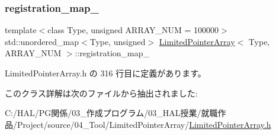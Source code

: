 \subsubsection{\texorpdfstring{registration\+\_\+map\+\_\+}{registration\_map\_}}
{\footnotesize\ttfamily template$<$class Type, unsigned A\+R\+R\+A\+Y\+\_\+\+N\+UM = 100000$>$ \\
std\+::unordered\+\_\+map$<$Type, unsigned$>$ \mbox{\hyperlink{class_limited_pointer_array}{Limited\+Pointer\+Array}}$<$ Type, A\+R\+R\+A\+Y\+\_\+\+N\+UM $>$\+::registration\+\_\+map\+\_\+\hspace{0.3cm}{\ttfamily [private]}}



 Limited\+Pointer\+Array.\+h の 316 行目に定義があります。



このクラス詳解は次のファイルから抽出されました\+:\begin{DoxyCompactItemize}
\item 
C\+:/\+H\+A\+L/\+P\+G関係/03\+\_\+作成プログラム/03\+\_\+\+H\+A\+L授業/就職作品/\+Project/source/04\+\_\+\+Tool/\+Limited\+Pointer\+Array/\mbox{\hyperlink{_limited_pointer_array_8h}{Limited\+Pointer\+Array.\+h}}\end{DoxyCompactItemize}
